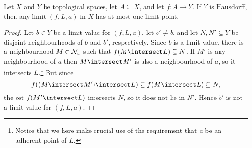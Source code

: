 \documentclass[article, a4paper, 11pt, oneside]{memoir}
\numberwithin{equation}{chapter}
\begin{document}
\begin{proposition}
    \label{prop:Hausdorff-limits-unique}
    Let $X$ and $Y$ be topological spaces, let $A \subseteq X$, and let $f \colon A \to Y$. If $Y$ is Hausdorff, then any limit $(f,L,a)$ in $X$ has at most one limit point.
\end{proposition}

\begin{proof}
    Let $b \in Y$ be a limit value for $(f,L,a)$, let $b' \neq b$, and let $N,N' \subseteq Y$ be disjoint neighbourhoods of $b$ and $b'$, respectively. Since $b$ is a limit value, there is a neighbourhood $M \in \mathcal{N}_{a}$ such that $f(M \intersect L) \subseteq N$. If $M'$ is any neighbourhood of $a$ then $M \intersect M'$ is also a neighbourhood of $a$, so it intersects $L$.\footnote{Notice that we here make crucial use of the requirement that $a$ be an adherent point of $L$.} But since
    \begin{equation*}
        f((M \intersect M') \intersect L)
            \subseteq f(M \intersect L)
            \subseteq N,
    \end{equation*}
    the set $f(M' \intersect L)$ intersects $N$, so it does not lie in $N'$. Hence $b'$ is not a limit value for $(f,L,a)$.
\end{proof}

\renewcommand{\ball}[3][]{B_{#1}(#2,#3)}
\newcommand{\cball}[3][]{\overline{B}_{#1}(#2,#3)}
\newcommand{\pball}[3][]{B'_{#1}(#2,#3)}
\end{document}
